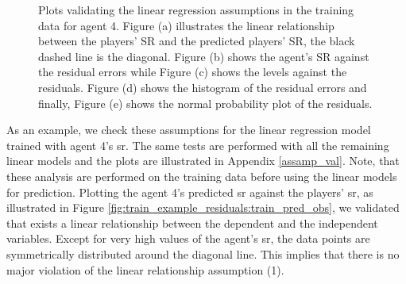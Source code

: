 \begin{figure}[t]
    \caption{Plots validating the linear regression assumptions in the training data for agent 4. Figure (a) illustrates the linear relationship between the players' SR and the predicted players' SR, the black dashed line is the diagonal. Figure (b) shows the agent's SR against the residual errors while Figure (c) shows the levels against the residuals. Figure (d) shows the histogram of the residual errors and finally, Figure (e) shows the normal probability plot of the residuals.}
    \label{fig:train_example_residuals}
\end{figure}
\noindent
As an example, we check these assumptions for the linear regression model trained with agent 4's \acs{sr}. The same tests are performed with all the remaining linear models and the plots are illustrated in Appendix \ref{assamp_val}. Note, that these analysis are performed on the training data before using the linear models for prediction.
Plotting the agent 4's predicted \acs{sr} against the players' \acs{sr}, as illustrated in Figure \ref{fig:train_example_residuals:train_pred_obs}, we validated that exists a linear relationship between the dependent and the independent variables. Except for very high values of the agent's \acs{sr}, the data points are symmetrically distributed around the diagonal line. This implies that there is no major violation of the linear relationship assumption (1). 
